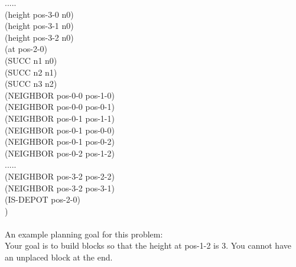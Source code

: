 \begin{tcolorbox}[redbox]
\begin{minipage}{0.95\columnwidth}
..... \\
    (height pos-3-0 n0) \\
    (height pos-3-1 n0) \\
    (height pos-3-2 n0) \\
    (at pos-2-0) \\
    (SUCC n1 n0) \\
    (SUCC n2 n1) \\
    (SUCC n3 n2) \\
    (NEIGHBOR pos-0-0 pos-1-0) \\
    (NEIGHBOR pos-0-0 pos-0-1) \\
    (NEIGHBOR pos-0-1 pos-1-1) \\
    (NEIGHBOR pos-0-1 pos-0-0) \\
    (NEIGHBOR pos-0-1 pos-0-2) \\
    (NEIGHBOR pos-0-2 pos-1-2) \\
..... \\
    (NEIGHBOR pos-3-2 pos-2-2) \\
    (NEIGHBOR pos-3-2 pos-3-1) \\
    (IS-DEPOT pos-2-0) \\
)
\\ \\
An example planning goal for this problem:   \\
Your goal is to build blocks so that the height at pos-1-2 is 3. 
You cannot have an unplaced block at the end. 
\end{minipage}
\end{tcolorbox} \\ \\
